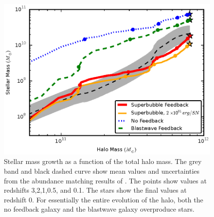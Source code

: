 \begin{figure}
    \includegraphics[width=\columnwidth]{figures2/mass_growth.eps}
    \caption[Stellar mass growth for different feedback models]{Stellar mass
    growth as a function of the total halo mass.  The grey band and black dashed
    curve show mean values and uncertainties from the abundance matching results
    of \citet{Behroozi2013}.  The points show values at redshifts 3,2,1,0.5, and
    0.1.  The stars show the final values at redshift 0.  For essentially the
    entire evolution of the halo, both the no feedback galaxy and the blastwave
    galaxy overproduce stars.}
    \label{mass_growth}
\end{figure}
